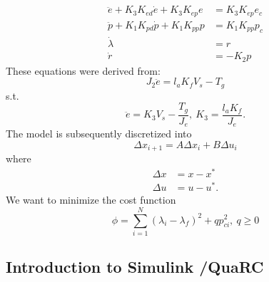 \begin{subequations}
\label{eq:model_al}
\begin{align}
	\ddot{e} + K_{3} K_{ed} \dot{e} + K_{3} K_{ep} e &= K_{3} K_{ep} e_{c} \label{eq:model_se_al_elev} \\
	\ddot{p} + K_{1} K_{pd} \dot{p} + K_{1} K_{pp} p &= K_{1} K_{pp} p_{c} \label{eq:model_se_al_pitch} \\
	\dot{\lambda} &= r \label{eq:model_se_al_lambda} \\
	\dot{r} &= -K_{2} p \label{eq:model_se_al_r} 
\end{align}
\end{subequations}
These equations were derived from: 
\begin{equation}
	J_{2} \ddot{e} = l_{a} K_{f} V_{s} - T_{g}
	\end{equation}
s.t.
\begin{equation*}
\ddot{e}=K_{3} V_{s}-\frac{T_{g}}{J_{e}},\: K_{3}=\frac{l_{a}K_{f}}{J_{e}}.
\end{equation*}
The model is subsequently discretized into
\begin{equation*}
\Delta x_{i+1}=A\Delta x_{i} + B\Delta u_{i}
\end{equation*} 	
where
\begin{align}
\Delta x &= x -x^* \\
\Delta u &= u -u^*.
\end{align}
We want to minimize the cost function 
\begin{equation}
\phi = \sum_{i=1}^{N}(\lambda_{i}-\lambda_{f})^2+qp_{ci}^{2},\:q\geq 0
\end{equation}
\subsection{Introduction to Simulink /QuaRC}

